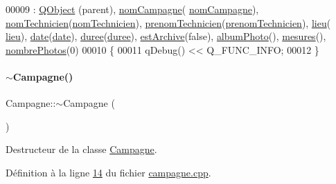 \begin{DoxyCode}
00009                                                                                                            
                                            : \hyperlink{class_q_object}{QObject} (parent), \hyperlink{class_campagne_a4455078418041442fa3998b9b6cb6230}{nomCampagne}(
      \hyperlink{class_campagne_a4455078418041442fa3998b9b6cb6230}{nomCampagne}), \hyperlink{class_campagne_a6d3e88fb93b38cbcf1bc53cc9fc30f2f}{nomTechnicien}(\hyperlink{class_campagne_a6d3e88fb93b38cbcf1bc53cc9fc30f2f}{nomTechnicien}), 
      \hyperlink{class_campagne_a9cc37c9671136683b5dac87ff34017bc}{prenomTechnicien}(\hyperlink{class_campagne_a9cc37c9671136683b5dac87ff34017bc}{prenomTechnicien}), \hyperlink{class_campagne_a1df66832d5d700bfd2bd36fe548f7cba}{lieu}(
      \hyperlink{class_campagne_a1df66832d5d700bfd2bd36fe548f7cba}{lieu}), \hyperlink{class_campagne_ac8180e3e533648770c4e6d9a182fe3ed}{date}(\hyperlink{class_campagne_ac8180e3e533648770c4e6d9a182fe3ed}{date}), \hyperlink{class_campagne_a4fb4cb286275103c9b6946e25e301fbf}{duree}(\hyperlink{class_campagne_a4fb4cb286275103c9b6946e25e301fbf}{duree}), \hyperlink{class_campagne_a6ff3284dd54897c32c2ab9478f1f50ec}{estArchive}(\textcolor{keyword}{false}), 
      \hyperlink{class_campagne_a4d1fc7d4dbf10868a297fe3df7f08dbf}{albumPhoto}(), \hyperlink{class_campagne_ac460df42e2fbc12aae7b97abbe219ad0}{mesures}(), \hyperlink{class_campagne_a3696e02e3cefc30bf4f284152917718b}{nombrePhotos}(0)
00010 \{
00011     qDebug() << Q\_FUNC\_INFO;
00012 \}
\end{DoxyCode}
\mbox{\label{class_campagne_a250c1d51fba057efbd7d1f66dce7c6e9}} 
\paragraph{\texorpdfstring{$\sim$\+Campagne()}{~Campagne()}}
{\footnotesize\ttfamily Campagne\+::$\sim$\+Campagne (\begin{DoxyParamCaption}{ }\end{DoxyParamCaption})}



Destructeur de la classe \hyperlink{class_campagne}{Campagne}. 



Définition à la ligne \hyperlink{campagne_8cpp_source_l00014}{14} du fichier \hyperlink{campagne_8cpp_source}{campagne.\+cpp}.


